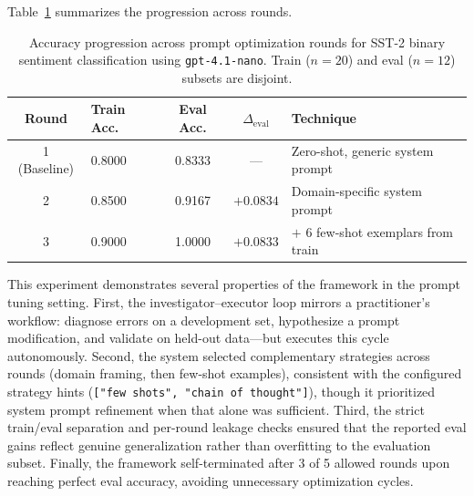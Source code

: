Table~\ref{tab:sentiment-progression} summarizes the progression across rounds.

\begin{table}[t]
  \centering
  \caption{Accuracy progression across prompt optimization rounds for SST-2 binary sentiment classification using \texttt{gpt-4.1-nano}. Train ($n{=}20$) and eval ($n{=}12$) subsets are disjoint.}
  \label{tab:sentiment-progression}
  \begin{tabular}{clccl}
    \toprule
    Round & Train Acc. & Eval Acc. & $\Delta_{\text{eval}}$ & Technique \\
    \midrule
    1 (Baseline)  & 0.8000 & 0.8333 & ---      & Zero-shot, generic system prompt \\
    2              & 0.8500 & 0.9167 & $+0.0834$ & Domain-specific system prompt \\
    3              & 0.9000 & 1.0000 & $+0.0833$ & $+$ 6 few-shot exemplars from train \\
    \bottomrule
  \end{tabular}
\end{table}

This experiment demonstrates several properties of the framework in the prompt tuning setting. First, the investigator--executor loop mirrors a practitioner's workflow: diagnose errors on a development set, hypothesize a prompt modification, and validate on held-out data---but executes this cycle autonomously. Second, the system selected complementary strategies across rounds (domain framing, then few-shot examples), consistent with the configured strategy hints (\texttt{["few shots", "chain of thought"]}), though it prioritized system prompt refinement when that alone was sufficient. Third, the strict train/eval separation and per-round leakage checks ensured that the reported eval gains reflect genuine generalization rather than overfitting to the evaluation subset. Finally, the framework self-terminated after 3 of 5 allowed rounds upon reaching perfect eval accuracy, avoiding unnecessary optimization cycles.